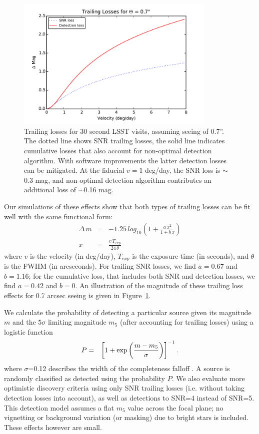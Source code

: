 \begin{figure}[t!]
\centering
\includegraphics[width=0.85\textwidth]{figures/trailing_losses}
\caption{Trailing losses for 30 second LSST visits, assuming seeing of
  0.7''. The dotted line shows SNR trailing losses, the solid line
  indicates cumulative losses that also account for non-optimal detection
  algorithm. With software improvements the latter detection losses can be
  mitigated. At the fiducial $v=1$ deg/day, the SNR loss is $\sim$0.3 mag,
  and non-optimal detection algorithm contributes an additional loss of
  $\sim$0.16 mag.
\label{fig:trailinglosses}}
\end{figure}

Our simulations of these effects show that both types of trailing losses can be fit well with the
same functional form:
\begin{eqnarray}
\Delta \, m & = &-1.25 \, log_{10} \left( 1 + \frac{a \, x^2} { 1 + b\,
    x} \right) \\
x & = & \frac{v \, T_{exp}} {24 \, \theta}
\end{eqnarray}
where $v$ is the velocity (in deg/day), $T_{exp}$ is the exposure time (in seconds), and $\theta$ is the FWHM (in arcseconds). For trailing SNR losses, we find $a = 0.67$ and $b = 1.16$; for the cumulative loss, that includes both SNR and detection losses,
we find $a=0.42$ and $b=0$. An illustration of the magnitude of these trailing loss effects for 0.7 arcsec seeing is given in Figure~\ref{fig:trailinglosses}.

We calculate the probability of detecting a particular source given its magnitude $m$
and the $5\sigma$ limiting magnitude $m_5$ (after accounting for trailing losses) using a logistic function
\begin{eqnarray}
     P & = & \left[ 1 +  {\rm exp}\left(\frac {m -  m_5}{\sigma}\right) \right]^{-1}.
\end{eqnarray}
where $\sigma$=0.12 describes the width of the completeness falloff \citep{2014ApJ...794..120A}. A source is randomly classified
as detected using the probability $P$. We also evaluate more optimistic discovery criteria using only SNR trailing losses
(i.e. without taking detection losses into account), as well as detections to SNR=4 instead of SNR=5.  This detection model assumes a flat $m_5$
value across the focal plane; no vignetting or background variation (or masking) due to bright stars is included. These effects however are small.


